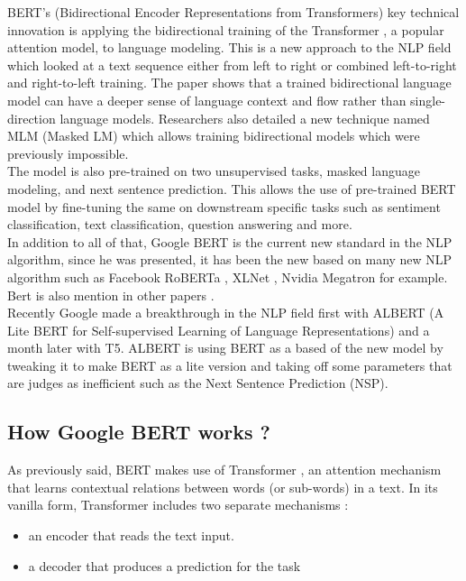 BERT’s \cite{Devlin2018} (Bidirectional Encoder Representations from Transformers) key technical innovation is applying the bidirectional training of the Transformer \cite{Vaswani2017}, a popular attention model, to language modeling. This is a new approach to the NLP field which looked at a text sequence either from left to right or combined left-to-right and right-to-left training. The paper shows that a trained bidirectional language model can have a deeper sense of language context and flow rather than single-direction language models. Researchers also detailed a new technique named MLM (Masked LM) which allows training bidirectional models which were previously impossible. \\
The model is also pre-trained on two unsupervised tasks, masked language modeling, and next sentence prediction. This allows the use of pre-trained BERT model by fine-tuning the same on downstream specific tasks such as sentiment classification, text classification, question answering and more.\\

In addition to all of that, Google BERT is the current new standard in the NLP algorithm, since he was presented, it has been the new based on many new NLP algorithm such as Facebook RoBERTa \cite{Liu2019d}, XLNet \cite{Yang2019}, Nvidia Megatron \cite{Shoeybi} for example. Bert is also mention in other papers \cite{Zhu2019, Wang2019c}. \\ 

Recently Google made a breakthrough in the NLP field first with ALBERT (A Lite BERT for Self-supervised Learning of Language Representations) \cite{Lan} and a month later with T5\cite{Raffel2019}. ALBERT is using BERT as a based of the new model by tweaking it to make BERT as a lite version and taking off some parameters that are judges as inefficient such as the Next Sentence Prediction (NSP).

\subsection{How Google BERT works ?}
As previously said, BERT makes use of Transformer  \cite{Vaswani2017}, an attention mechanism that learns contextual relations between words (or sub-words) in a text. In its vanilla form, Transformer includes two separate mechanisms : 

\begin{itemize}
\item an encoder that reads the text input.
\item a decoder that produces a prediction for the task
\end{itemize}

